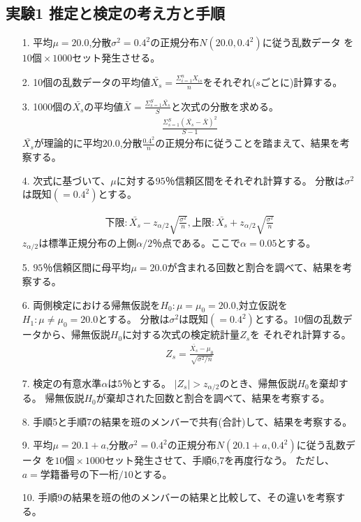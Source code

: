 \documentclass[12pt]{jarticle}
\begin{document}
\subsection{実験1 推定と検定の考え方と手順}
\begin{itemize}
      \item [1.]平均$\mu=20.0$,分散$\sigma^2=0.4^2$の正規分布$N(20.0,0.4^2)$に従う乱数データ
            を$10個\times 1000セット$発生させる。
      \item [2.]10個の乱数データの平均値$\bar{X_s}=\frac{\Sigma^{n}_{i=1}X_{is}}{n}$をそれぞれ($s$ごとに)計算する。
      \item [3.]1000個の$\bar{X_s}$の平均値$\bar{X}=\frac{\Sigma^{S}_{s=1}\bar{X_s}}{S}$と次式の分散を求める。
            \begin{eqnarray}
                  \frac{\Sigma^{S}_{s=1}(\bar{X_s}-\bar{X})^2}{S-1}\nonumber
            \end{eqnarray}
            $\bar{X_s}$が理論的に平均$20.0$,分散$\frac{0.4^2}{n}$の正規分布に従うことを踏まえて、結果を考察する。
      \item [4.]次式に基づいて、$\mu$に対する$95％$信頼区間をそれぞれ計算する。
            分散は$\sigma^2$は既知$(=0.4^2)$とする。

            \begin{eqnarray}
                  下限:\bar{X_s}-z_{\alpha/2}\sqrt{\frac{\sigma^2}{n}},　上限:\bar{X_s}+z_{\alpha/2}\sqrt{\frac{\sigma^2}{n}}\nonumber
            \end{eqnarray}
            $z_{\alpha/2}$は標準正規分布の上側$\alpha/2％$点である。ここで$\alpha=0.05$とする。
      \item [5.]$95％$信頼区間に母平均$\mu=20.0$が含まれる回数と割合を調べて、結果を考察する。
      \item [6.]両側検定における帰無仮説を$H_0:\mu=\mu_0=20.0$,対立仮説を$H_1:\mu\neq\mu_0=20.0$とする。
            分散は$\sigma^2$は既知$(=0.4^2)$とする。10個の乱数データから、帰無仮説$H_0$に対する次式の検定統計量$Z_s$を
            それぞれ計算する。
            \begin{eqnarray}
                  Z_s=\frac{\bar{X_s}-\mu_0}{\sqrt{\sigma^2/n}}\nonumber
            \end{eqnarray}
      \item [7.]検定の有意水準$\alpha$は$5％$とする。
            $|Z_s|>z_{\alpha/2}$のとき、帰無仮説$H_0$を棄却する。
            帰無仮説$H_0$が棄却された回数と割合を調べて、結果を考察する。
      \item [8.]手順5と手順7の結果を班のメンバーで共有(合計)して、結果を考察する。
      \item [9.]平均$\mu=20.1+a$,分散$\sigma^2=0.4^2$の正規分布$N(20.1+a,0.4^2)$に従う乱数データ
            を$10個\times 1000セット$発生させて、手順6,7を再度行なう。
            ただし、$a=学籍番号の下一桁/10$とする。
      \item [10.]手順9の結果を班の他のメンバーの結果と比較して、その違いを考察する。
\end{itemize}
\end{document}
